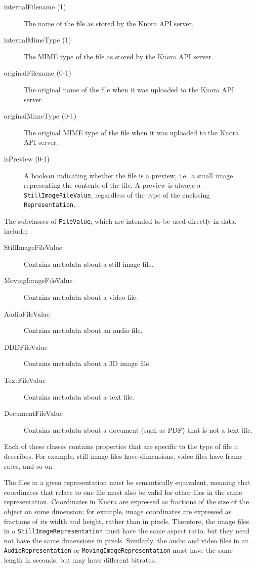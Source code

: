 \documentclass[12pt, a4paper]{article}
\begin{document}
\begin{description}
	\item[internalFilename (1)] The name of the file as stored by the Knora API server.
	\item[internalMimeType (1)] The MIME type of the file as stored by the Knora API server.
	\item[originalFilename (0-1)] The original name of the file when it was uploaded to the Knora API server.
	\item[originalMimeType (0-1)] The original MIME type of the file when it was uploaded to the Knora API server.
	\item[isPreview (0-1)] A boolean indicating whether the file is a preview, i.e.\ a small image representing the contents of the file. A preview is always a \texttt{Still\-Image\-File\-Value}, regardless of the type of the enclosing \texttt{Representation}.
\end{description}

The subclasses of \texttt{FileValue}, which are intended to be used directly in data, include:

\begin{description}
	\item[StillImageFileValue] Contains metadata about a still image file.
	\item[MovingImageFileValue] Contains metadata about a video file.
	\item[AudioFileValue] Contains metadata about an audio file.
	\item[DDDFileValue] Contains metadata about a 3D image file.
	\item[TextFileValue] Contains metadata about a text file.
	\item[DocumentFileValue] Contains metadata about a document (such as PDF) that is not a text file.
\end{description}

Each of these classes contains properties that are specific to the type of file it describes. For example, still image files have dimensions, video files have frame rates, and so on.

The files in a given representation must be semantically equivalent, meaning that coordinates that relate to one file must also be valid for other files in the same representation. Coordinates in Knora are expressed as fractions of the size of the object on some dimension; for example, image coordinates are expressed as fractions of its width and height, rather than in pixels. Therefore, the image files in a \texttt{StillImageRepresentation} must have the same aspect ratio, but they need not have the same dimensions in pixels. Similarly, the audio and video files in an \texttt{AudioRepresentation} or \texttt{MovingImageRepresentation} must have the same length in seconds, but may have different bitrates.
\end{document}
